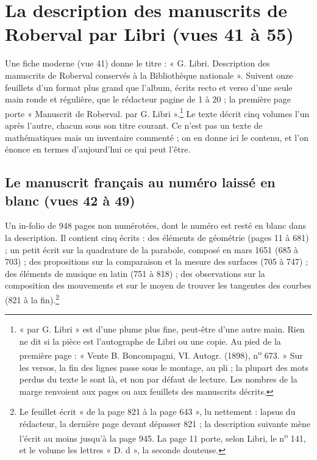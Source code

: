 \documentclass[11pt,a4paper]{article}
\begin{document}
\section*{La description des manuscrits de Roberval par Libri (vues 41 à 55)}

Une fiche moderne (vue 41) donne le titre : « G. Libri. Description des
manuscrits de Roberval conservés à la Bibliothèque nationale ». Suivent onze
feuillets d'un format plus grand que l'album, écrits recto et verso d'une
seule main ronde et régulière, que le rédacteur pagine de 1 à 20 ; la
première page porte « Manuscrit de Roberval. par G. Libri ».\footnote{« par
G. Libri » est d'une plume plus fine, peut-être d'une autre main. Rien ne dit
si la pièce est l'autographe de Libri ou une copie. Au pied de la première
page : « Vente B. Boncompagni, VI. Autogr. (1898), n\textsuperscript{o} 673. »
Sur les versos, la fin des lignes passe sous le montage, au pli ; la plupart
des mots perdus du texte le sont là, et non par défaut de lecture. Les nombres
de la marge renvoient aux pages ou aux feuillets des manuscrits décrits.} Le
texte décrit cinq volumes l'un après l'autre, chacun sous son titre courant.
Ce n'est pas un texte de mathématiques mais un inventaire commenté ; on en
donne ici le contenu, et l'on énonce en termes d'aujourd'hui ce qui peut
l'être.

\subsection*{Le manuscrit français au numéro laissé en blanc (vues 42 à 49)}

Un in-folio de 948 pages non numérotées, dont le numéro est resté en blanc
dans la description. Il contient cinq écrits : des éléments de géométrie
(pages 11 à 681) ; un petit écrit sur la quadrature de la parabole, composé
en mars 1651 (685 à 703) ; des propositions sur la comparaison et la mesure
des surfaces (705 à 747) ; des éléments de musique en latin (751 à 818) ; des
observations sur la composition des mouvements et sur le moyen de trouver les
tangentes des courbes (821 à la fin).\footnote{Le feuillet écrit « de la page
821 à la page 643 », lu nettement : lapsus du rédacteur, la dernière page
devant dépasser 821 ; la description suivante mène l'écrit au moins jusqu'à
la page 945. La page 11 porte, selon Libri, le n\textsuperscript{o} 141, et le
volume les lettres « D. d », la seconde douteuse.}
\end{document}
